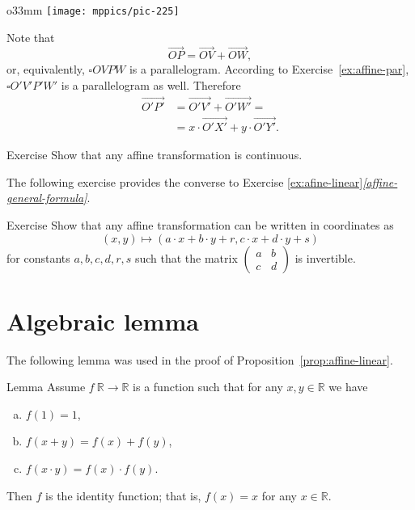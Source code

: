 \begin{wrapfigure}{o}{33mm}
\centering
\texttt{[image: mppics/pic-225]}
\end{wrapfigure}

Note that 
\[\overrightarrow{OP}=\overrightarrow{OV}+\overrightarrow{OW},\]
or, equivalently, $\square OVPW$ is a parallelogram.
According to Exercise~\ref{ex:affine-par}, $\square O'V'P'W'$ is a parallelogram as well.
Therefore 
\begin{align*}\overrightarrow{O'P'}&=\overrightarrow{O'V'}+\overrightarrow{O'W'}=
\\
&=x\cdot\overrightarrow{O'X'}+y\cdot\overrightarrow{O'Y'}.
\end{align*}
\qedsf

\begin{thm}{Exercise}\label{ex:affine-continuous}
Show that any affine transformation is continuous.
\end{thm}

The following exercise provides the converse to Exercise \ref{ex:afine-linear}\textit{\ref{affine-general-formula}}.

\begin{thm}{Exercise}\label{ex:affine-coordinates}
Show that any affine transformation can be written in coordinates as 
\[(x,y)\mapsto(a\cdot x+b\cdot y+r,c\cdot x+d\cdot y+s)\]
for constants $a,b,c,d,r,s$ such that the matrix $(\begin{smallmatrix}a&b\\c&d\end{smallmatrix})$ is invertible. 
\end{thm}


\section*{Algebraic lemma}

The following lemma was used in the proof of Proposition~\ref{prop:affine-linear}.

\begin{thm}{Lemma}\label{lem:R-auto}
Assume $f\:\mathbb{R}\to\mathbb{R}$ is a function such that for any $x,y\in\mathbb{R}$ we have
\begin{enumerate}[(a)]
\item\label{lem:R-auto:a} $f(1)=1$,
\item\label{lem:R-auto:b} $f(x+y)=f(x)+f(y)$,
\item\label{lem:R-auto:c} $f(x\cdot y)=f(x)\cdot f(y)$.
\end{enumerate}

Then $f$ is the identity function; that is,
$f(x)=x$ for any $x\in \mathbb{R}$.
\end{thm}

